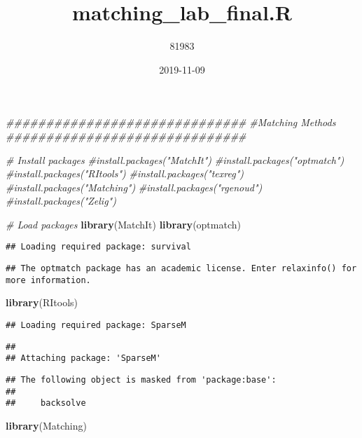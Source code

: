 \documentclass[]{article}
\title{matching\_lab\_final.R}
\author{81983}
\date{2019-11-09}
\newenvironment{Shaded}{\begin{snugshade}}{\end{snugshade}}
\newcommand{\CommentTok}[1]{\textcolor[rgb]{0.56,0.35,0.01}{\textit{#1}}}
\newcommand{\KeywordTok}[1]{\textcolor[rgb]{0.13,0.29,0.53}{\textbf{#1}}}
\newcommand{\NormalTok}[1]{#1}
\begin{document}
\maketitle

\begin{Shaded}
\begin{Highlighting}[]
\CommentTok{##############################}
\CommentTok{#Matching Methods }
\CommentTok{##############################}

\CommentTok{# Install packages}
\CommentTok{#install.packages("MatchIt")}
\CommentTok{#install.packages("optmatch")}
\CommentTok{#install.packages("RItools")}
\CommentTok{#install.packages("texreg")}
\CommentTok{#install.packages("Matching")}
\CommentTok{#install.packages("rgenoud")}
\CommentTok{#install.packages("Zelig")}

\CommentTok{# Load packages}
\KeywordTok{library}\NormalTok{(MatchIt)}
\KeywordTok{library}\NormalTok{(optmatch)}
\end{Highlighting}
\end{Shaded}

\begin{verbatim}
## Loading required package: survival
\end{verbatim}

\begin{verbatim}
## The optmatch package has an academic license. Enter relaxinfo() for more information.
\end{verbatim}

\begin{Shaded}
\begin{Highlighting}[]
\KeywordTok{library}\NormalTok{(RItools)}
\end{Highlighting}
\end{Shaded}

\begin{verbatim}
## Loading required package: SparseM
\end{verbatim}

\begin{verbatim}
## 
## Attaching package: 'SparseM'
\end{verbatim}

\begin{verbatim}
## The following object is masked from 'package:base':
## 
##     backsolve
\end{verbatim}

\begin{Shaded}
\begin{Highlighting}[]
\KeywordTok{library}\NormalTok{(Matching)}
\end{Highlighting}
\end{Shaded}
\end{document}
